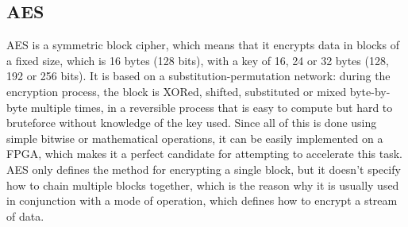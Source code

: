 \documentclass[12pt,oneside,a4paper]{article}
\begin{document}
\subsection{AES} \label{subsec:aes}
AES \cite{aes:specification} is a symmetric block cipher, which means that it encrypts data in blocks of a fixed size, which is 16 bytes (128 bits), with a key of 16, 24 or 32 bytes (128, 192 or 256 bits).
It is based on a substitution-permutation network: during the encryption process, the block is XORed, shifted, substituted or mixed byte-by-byte multiple times, in a reversible process that is easy to compute but hard to bruteforce without knowledge of the key used.
Since all of this is done using simple bitwise or mathematical operations, it can be easily implemented on a FPGA, which makes it a perfect candidate for attempting to accelerate this task.
\\AES only defines the method for encrypting a single block, but it doesn't specify how to chain multiple blocks together, which is the reason why it is usually used in conjunction with a mode of operation, which defines how to encrypt a stream of data.
\end{document}
